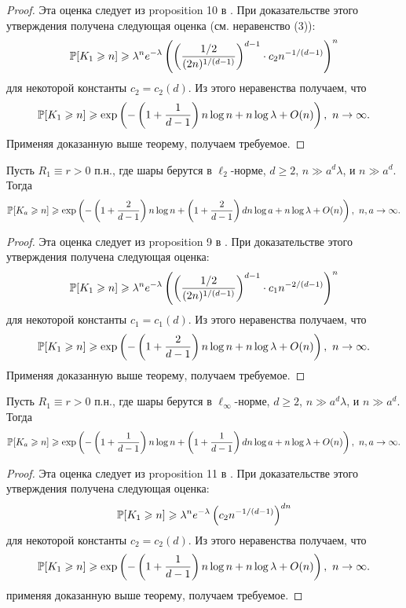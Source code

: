 \begin{proof}
    Эта оценка следует из proposition 10 в \cite{AL}. При доказательстве этого утверждения получена следующая оценка (см. неравенство (3)):
    $$\mathbb{P}[K_1 \geqslant n] \geqslant \lambda^n e^{-\lambda}\left(\left(\dfrac{1/2}{(2n)^{1/(d-1)}}\right)^{d-1}\cdot c_2n^{-1/(d-1)}\right)^n$$ для некоторой константы $c_2 = c_2(d)$. Из этого неравенства получаем, что
    $$\mathbb{P}[K_1 \geqslant n] \geqslant \exp \left(-\left(1+\dfrac{1}{d-1}\right)n\log n   +n\log\lambda + O(n)\right),\  n \to \infty.$$ Применяя доказанную выше теорему, получаем требуемое.
\end{proof}{}

\begin{cor}
Пусть $R_1\equiv r > 0$ п.н., где шары берутся в $\ell_2$-норме, $d\geq 2$, $n \gg a^d\lambda$, и $n\gg a^d$. 
Тогда $$\mathbb{P}[K_a \geqslant n] \geqslant \exp \left(-\left(1+\dfrac{2}{d-1}\right)n\log n + \left(1+\dfrac{2}{d-1}\right)dn\log a  +n\log\lambda + O(n)\right),\  n, a\to \infty.$$
\end{cor}{}

\begin{proof}
    Эта оценка следует из proposition 9 в \cite{AL}. При доказательстве этого утверждения получена следующая оценка:
    $$\mathbb{P}[K_1 \geqslant n] \geqslant \lambda^n e^{-\lambda}\left(\left(\dfrac{1/2}{(2n)^{1/(d-1)}}\right)^{d-1}\cdot c_1n^{-2/(d-1)}\right)^n$$ для некоторой константы $c_1 = c_1(d)$. Из этого неравенства получаем, что 
    $$\mathbb{P}[K_1 \geqslant n] \geqslant \exp \left(-\left(1+\dfrac{2}{d-1}\right)n\log n   +n\log\lambda + O(n)\right),\  n \to \infty.$$  Применяя доказанную выше теорему, получаем требуемое.
\end{proof}{}

\begin{cor}
Пусть $R_1\equiv r > 0$ п.н., где шары берутся в $\ell_\infty$-норме, $d\geq 2$, $n \gg a^d\lambda$, и $n\gg a^d$. 
Тогда $$\mathbb{P}[K_a \geqslant n] \geqslant \exp \left(-\left(1+\dfrac{1}{d-1}\right)n\log n + \left(1+\dfrac{1}{d-1}\right)dn\log a  +n\log\lambda + O(n)\right),\  n, a\to \infty.$$
\end{cor}{}

\begin{proof}
    Эта оценка следует из proposition 11 в \cite{AL}. При доказательстве этого утверждения получена следующая оценка:
    $$\mathbb{P}[K_1 \geqslant n] \geqslant \lambda^n e^{-\lambda}\left(c_2 n^{-1/(d-1)}\right)^{dn}$$ для некоторой константы $c_2 = c_2(d)$. Из этого неравенства получаем, что
    $$\mathbb{P}[K_1 \geqslant n] \geqslant \exp \left(-\left(1+\dfrac{1}{d-1}\right)n\log n   +n\log\lambda + O(n)\right),\  n \to \infty.$$ применяя доказанную выше теорему, получаем требуемое.
\end{proof}{}

